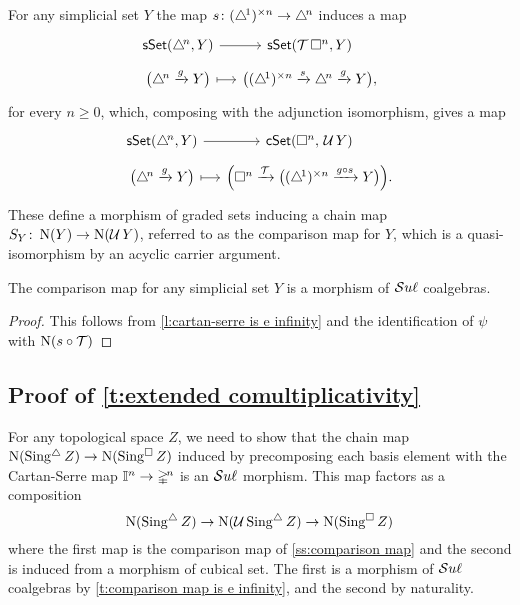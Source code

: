 For any simplicial set $Y$ the map $s \colon (\triangle^{\!1})^{\times n} \to \triangle^{\!n}$ induces a map
\[
\begin{tikzcd}[column sep = small, row sep=tiny]
\sSet(\simplex^{\!n}, Y) \arrow[r] &
\sSet(\T \cube^n, Y) \\
\big( \simplex^{\!n} \xrightarrow{g} Y \big) \arrow[r, maps to] &
\big(\scube{n} \xrightarrow{s} \simplex^{\!n} \xrightarrow{g} Y \big),
\end{tikzcd}
\]
for every $n \geq 0$, which, composing with the adjunction isomorphism, gives a map
\[
\begin{tikzcd}[column sep = small, row sep=tiny]
\sSet(\simplex^{\!n}, Y) \arrow[r] &
\cSet(\cube^n,\, \U Y) \\
\big( \simplex^{\!n} \xrightarrow{g} Y \big) \arrow[r, maps to] &
\Big(\cube^n \xrightarrow{\T} \big(\scube{n} \xrightarrow{g \circ s} Y \big)\Big).
\end{tikzcd}
\]
These define a morphism of graded sets inducing a chain map $S_Y \colon \operatorname{N}(Y) \to \operatorname{N}(\operatorname{\mathcal{U}} Y)$, referred to as the comparison map for $Y$, which is a quasi-isomorphism by an acyclic carrier argument.

\begin{theorem} \label{t:comparison map is e infinity}
	The comparison map for any simplicial set $Y$ is a morphism of $\mathcal{S}u\ell$ coalgebras.
\end{theorem}

\begin{proof}
	This follows from \cref{l:cartan-serre is e infinity} and the identification of $\psi$ with $\operatorname{N}(s \circ \mathcal T)$
\end{proof}

\subsection{Proof of \cref{t:extended comultiplicativity}} \label{ss:proof extended comultiplicativity}

For any topological space $Z$, we need to show that the chain map $\operatorname{N}(\operatorname{Sing^{\triangle}} Z) \to \operatorname{N}(\operatorname{Sing^{\square}} Z)$ induced by precomposing each basis element with the Cartan-Serre map $\mathbb{I}^n \to \mathbb{\Delta}^{\!n}$ is an $\mathcal{S}u\ell$ morphism.
This map factors as a composition
\[
\operatorname{N}(\operatorname{Sing^{\triangle}} Z) \to \operatorname{N}(\operatorname{\mathcal{U}} \operatorname{Sing^{\triangle}} Z) \to \operatorname{N}(\operatorname{Sing^{\square}} Z)
\]
where the first map is the comparison map of \cref{ss:comparison map} and the second is induced from a morphism of cubical set.
The first is a morphism of $\mathcal{S}u\ell$ coalgebras by \cref{t:comparison map is e infinity}, and the second by naturality.